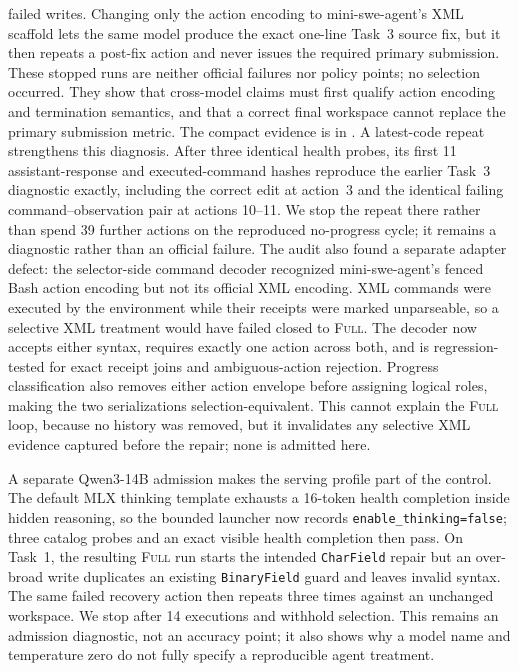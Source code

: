 \documentclass[11pt]{article}
\begin{document}
failed writes.  Changing only the action encoding to mini-swe-agent's XML
scaffold lets the same model produce the exact one-line Task~3 source fix, but
it then repeats a post-fix action and never issues the required primary
submission.  These stopped runs are neither official failures nor policy
points; no selection occurred.  They show that cross-model claims must first
qualify action encoding and termination semantics, and that a correct final
workspace cannot replace the primary submission metric.  The compact evidence
is in .
A latest-code repeat strengthens this diagnosis.  After three identical health
probes, its first 11 assistant-response and executed-command hashes reproduce
the earlier Task~3 diagnostic exactly, including the correct edit at action~3
and the identical failing command--observation pair at actions 10--11.  We stop
the repeat there rather than spend 39 further actions on the reproduced
no-progress cycle; it remains a diagnostic rather than an official failure.
The audit also found a separate adapter defect: the selector-side command
decoder recognized mini-swe-agent's fenced Bash action encoding but not its
official XML encoding.  XML commands were executed by the environment while
their receipts were marked unparseable, so a selective XML treatment would
have failed closed to \textsc{Full}.  The decoder now accepts either syntax,
requires exactly one action across both, and is regression-tested for exact
receipt joins and ambiguous-action rejection.  Progress classification also
removes either action envelope before assigning logical roles, making the two
serializations selection-equivalent.  This cannot explain the
\textsc{Full} loop, because no history was removed, but it invalidates any
selective XML evidence captured before the repair; none is admitted here.

A separate Qwen3-14B admission makes the serving profile part of the control.
The default MLX thinking template exhausts a 16-token health completion inside
hidden reasoning, so the bounded launcher now records
\texttt{enable\_thinking=false}; three catalog probes and an exact visible
health completion then pass.  On Task~1, the resulting \textsc{Full} run starts
the intended \texttt{CharField} repair but an over-broad write duplicates an
existing \texttt{BinaryField} guard and leaves invalid syntax.  The same failed
recovery action then repeats three times against an unchanged workspace.  We
stop after 14 executions and withhold selection.  This remains an admission
diagnostic, not an accuracy point; it also shows why a model name and
temperature zero do not fully specify a reproducible agent treatment.
\end{document}
